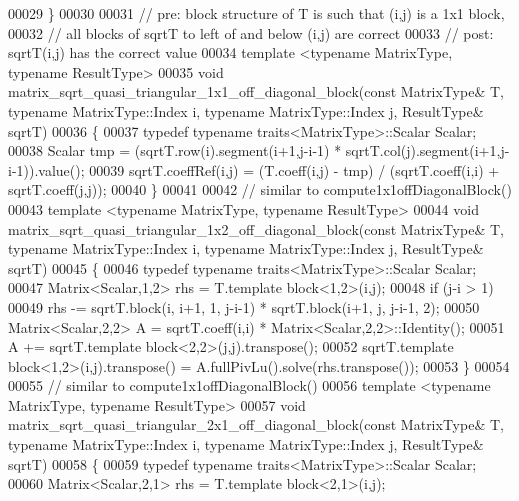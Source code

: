 \begin{DoxyCode}
00029 \}
00030 
00031 \textcolor{comment}{// pre:  block structure of T is such that (i,j) is a 1x1 block,}
00032 \textcolor{comment}{//       all blocks of sqrtT to left of and below (i,j) are correct}
00033 \textcolor{comment}{// post: sqrtT(i,j) has the correct value}
00034 \textcolor{keyword}{template} <\textcolor{keyword}{typename} MatrixType, \textcolor{keyword}{typename} ResultType>
00035 \textcolor{keywordtype}{void} matrix\_sqrt\_quasi\_triangular\_1x1\_off\_diagonal\_block(\textcolor{keyword}{const} MatrixType& T, \textcolor{keyword}{typename} MatrixType::Index i,
       \textcolor{keyword}{typename} MatrixType::Index j, ResultType& sqrtT)
00036 \{
00037   \textcolor{keyword}{typedef} \textcolor{keyword}{typename} traits<MatrixType>::Scalar Scalar;
00038   Scalar tmp = (sqrtT.row(i).segment(i+1,j-i-1) * sqrtT.col(j).segment(i+1,j-i-1)).value();
00039   sqrtT.coeffRef(i,j) = (T.coeff(i,j) - tmp) / (sqrtT.coeff(i,i) + sqrtT.coeff(j,j));
00040 \}
00041 
00042 \textcolor{comment}{// similar to compute1x1offDiagonalBlock()}
00043 \textcolor{keyword}{template} <\textcolor{keyword}{typename} MatrixType, \textcolor{keyword}{typename} ResultType>
00044 \textcolor{keywordtype}{void} matrix\_sqrt\_quasi\_triangular\_1x2\_off\_diagonal\_block(\textcolor{keyword}{const} MatrixType& T, \textcolor{keyword}{typename} MatrixType::Index i,
       \textcolor{keyword}{typename} MatrixType::Index j, ResultType& sqrtT)
00045 \{
00046   \textcolor{keyword}{typedef} \textcolor{keyword}{typename} traits<MatrixType>::Scalar Scalar;
00047   Matrix<Scalar,1,2> rhs = T.template block<1,2>(i,j);
00048   \textcolor{keywordflow}{if} (j-i > 1)
00049     rhs -= sqrtT.block(i, i+1, 1, j-i-1) * sqrtT.block(i+1, j, j-i-1, 2);
00050   Matrix<Scalar,2,2> A = sqrtT.coeff(i,i) * Matrix<Scalar,2,2>::Identity();
00051   A += sqrtT.template block<2,2>(j,j).transpose();
00052   sqrtT.template block<1,2>(i,j).transpose() = A.fullPivLu().solve(rhs.transpose());
00053 \}
00054 
00055 \textcolor{comment}{// similar to compute1x1offDiagonalBlock()}
00056 \textcolor{keyword}{template} <\textcolor{keyword}{typename} MatrixType, \textcolor{keyword}{typename} ResultType>
00057 \textcolor{keywordtype}{void} matrix\_sqrt\_quasi\_triangular\_2x1\_off\_diagonal\_block(\textcolor{keyword}{const} MatrixType& T, \textcolor{keyword}{typename} MatrixType::Index i,
       \textcolor{keyword}{typename} MatrixType::Index j, ResultType& sqrtT)
00058 \{
00059   \textcolor{keyword}{typedef} \textcolor{keyword}{typename} traits<MatrixType>::Scalar Scalar;
00060   Matrix<Scalar,2,1> rhs = T.template block<2,1>(i,j);

\end{DoxyCode}
